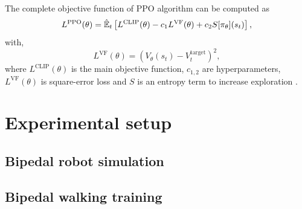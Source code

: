The complete objective function of PPO algorithm can be computed as
\begin{equation*}
	L^{\mathrm{PPO}}(\theta) = \hat{\mathbb{E}}_{t} \left[  L^{\mathrm{CLIP}}(\theta) - c_1 L^{\mathrm{VF}}(\theta)  + c_2 S[\pi_\theta](s_t)  \right],			
\end{equation*}	
with,
\begin{equation*}
	L^{\mathrm{VF}}(\theta) = \left( V_\theta (s_t) - V^{\mathrm{target}}_{t}  \right)^{2},	
\end{equation*}			
\noindent where $L^{\mathrm{CLIP}}(\theta)$ is the main objective function, $c_{1,2}$ are hyperparameters, $L^{\mathrm{VF}}(\theta)$ is square-error loss and $S$ is an entropy term to increase exploration \cite{schulman2017proximal}.

\section{Experimental setup}

\subsection{Bipedal robot simulation}

\subsection{Bipedal walking training}





